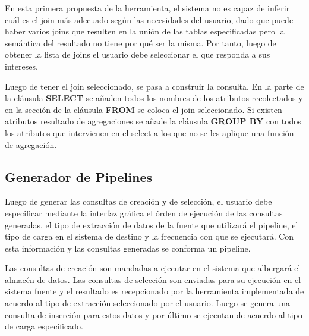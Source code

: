 En esta primera propuesta de la herramienta, el sistema no es capaz de inferir cu\'al es el join 
m\'as adecuado seg\'un las necesidades del usuario, dado que puede haber varios joins que resulten 
en la uni\'on de las tablas especificadas pero la sem\'antica del resultado no tiene por qu\'e ser 
la misma. Por tanto, luego de obtener la lista de joins el usuario debe seleccionar el que responda 
a sus intereses.

Luego de tener el join seleccionado, se pasa a construir la consulta. En la parte de la cl\'ausula 
\textbf{SELECT} se añaden todos los nombres de los atributos recolectados y en la secci\'on de la cl\'ausula 
\textbf{FROM} se coloca el join seleccionado. Si existen atributos resultado de agregaciones se añade 
la cl\'ausula \textbf{GROUP BY} con todos los atributos que intervienen en el select a los que no 
se les aplique una funci\'on de agregaci\'on.


\subsection{Generador de Pipelines}

Luego de generar las consultas de creaci\'on y de selecci\'on, el usuario debe especificar 
mediante la interfaz gr\'afica el \'orden de ejecuci\'on de las consultas generadas, 
el tipo de extracci\'on de datos de la fuente que utilizar\'a el pipeline, el tipo de carga 
en el sistema de destino y la frecuencia con que se ejecutar\'a. Con esta información y las 
consultas generadas se conforma un pipeline. 

Las consultas de creaci\'on son mandadas a ejecutar en el sistema que albergar\'a el almac\'en de 
datos. Las consultas de selecci\'on son enviadas para su ejecuci\'on en el sistema fuente y el resultado 
es recepcionado por la herramienta implementada de acuerdo al tipo de extracci\'on seleccionado por el usuario. 
Luego se genera una consulta de inserci\'on para estos 
datos y por \'ultimo se ejecutan de acuerdo al tipo de carga especificado.
